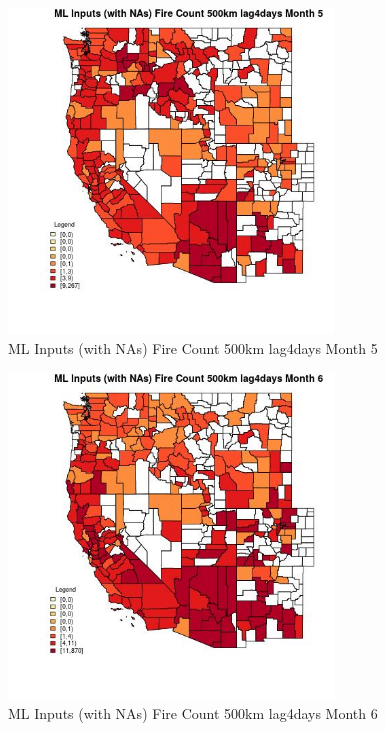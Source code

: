 \begin{figure} 
\centering  
\includegraphics[width=0.77\textwidth]{Code_Outputs/Report_ML_input_PM25_Step4_part_e_de_duplicated_aves_compiled_2019-05-21wNAs_CountyFire_Count_500km_lag4daysmedianMonth5.jpg} 
\caption{\label{fig:Report_ML_input_PM25_Step4_part_e_de_duplicated_aves_compiled_2019-05-21wNAsCountyFire_Count_500km_lag4daysmedianMonth5}ML Inputs (with NAs) Fire Count 500km lag4days Month 5} 
\end{figure} 
 

\begin{figure} 
\centering  
\includegraphics[width=0.77\textwidth]{Code_Outputs/Report_ML_input_PM25_Step4_part_e_de_duplicated_aves_compiled_2019-05-21wNAs_CountyFire_Count_500km_lag4daysmedianMonth6.jpg} 
\caption{\label{fig:Report_ML_input_PM25_Step4_part_e_de_duplicated_aves_compiled_2019-05-21wNAsCountyFire_Count_500km_lag4daysmedianMonth6}ML Inputs (with NAs) Fire Count 500km lag4days Month 6} 
\end{figure} 
 

